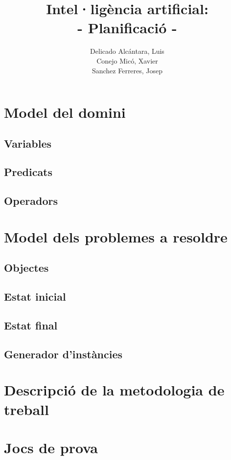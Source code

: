 \documentclass[11pt,a4paper]{article}
\author{
  Delicado Alcántara, Luis
  \\
  Conejo Micó, Xavier
  \\
  Sanchez Ferreres, Josep
}
\title{\Huge {Intel·ligència artificial:}\\ \huge{- Planificació -}}
\begin{document}
\begin{titlepage}
\clearpage\maketitle
\thispagestyle{empty}
\end{titlepage}

\clearpage

\tableofcontents

\newpage

\section{Model del domini}
\subsection{Variables}
\subsection{Predicats}
\subsection{Operadors}

\section{Model dels problemes a resoldre}
\subsection{Objectes}
\subsection{Estat inicial}
\subsection{Estat final}
\subsection{Generador d'instàncies}

\section{Descripció de la metodologia de treball}


\section{Jocs de prova}
\end{document}
